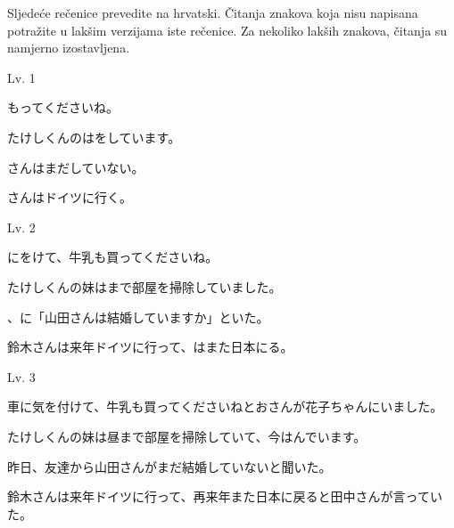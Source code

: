 
\author{Tomislav Mamić}

	
	\vspace{15pt}
	\noindent Sljedeće rečenice prevedite na hrvatski. Čitanja znakova koja nisu napisana potražite u lakšim verzijama iste rečenice. Za nekoliko lakših znakova, čitanja su namjerno izostavljena.

	\begin{mondai}{Lv. 1}
		\itemsep2pt
		\item {}も\hspace{12pt}ってくださいね。
		\item たけしくんのは\hspace{12pt}をしています。
		\item {}さんはまだしていない。
		\item {}さんはドイツに行く。
	\end{mondai}

	\begin{mondai}{Lv. 2}
		\itemsep2pt
		\item {}にをけて、牛乳も買ってくださいね。
		\item たけしくんの妹はまで部屋を掃除していました。
		\item {}、\hspace{5pt}に「山田さんは結婚していますか」といた。
		\item 鈴木さんは来年ドイツに行って、はまた日本にる。
	\end{mondai}

	\begin{mondai}{Lv. 3}
		\itemsep2pt
		\item 車に気を付けて、牛乳も買ってくださいねとおさんが花子ちゃんにいました。
		\item たけしくんの妹は昼まで部屋を掃除していて、今はんでいます。
		\item 昨日、友達から山田さんがまだ結婚していないと聞いた。
		\item 鈴木さんは来年ドイツに行って、再来年また日本に戻ると田中さんが言っていた。
	\end{mondai}
